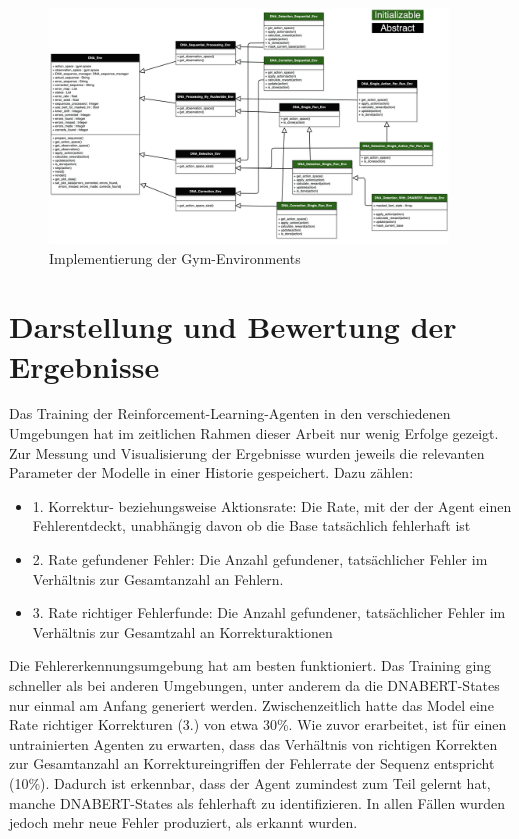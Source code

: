 \documentclass[oneside,bibliography=totocnumbered,BCOR=5mm]{scrbook}%
\theoremstyle{definition}
\theoremstyle{definition}
\theoremstyle{definition}
\theoremstyle{definition}
\theoremstyle{definition}
\theoremstyle{definition}
\begin{document}
\begin{figure}[t!]
  \centering
  \includegraphics[width=400px,keepaspectratio]{images/classes.png}
  \caption{Implementierung der Gym-Environments}
  \label{gymClasses}
\end{figure}

\chapter{Darstellung und Bewertung der Ergebnisse}
Das Training der Reinforcement-Learning-Agenten in den verschiedenen Umgebungen hat im 
zeitlichen Rahmen dieser Arbeit nur wenig Erfolge gezeigt.
Zur Messung und Visualisierung der Ergebnisse wurden jeweils die relevanten Parameter der Modelle 
in einer Historie gespeichert. Dazu zählen:  \\

\begin{itemize}
  \item 1. Korrektur- beziehungsweise Aktionsrate: Die Rate, mit der der Agent einen Fehlerentdeckt, 
  unabhängig davon ob die Base tatsächlich fehlerhaft ist
  \item 2. Rate gefundener Fehler: Die Anzahl gefundener, tatsächlicher Fehler im Verhältnis 
  zur Gesamtanzahl an Fehlern.
  \item 3. Rate richtiger Fehlerfunde: Die Anzahl gefundener, tatsächlicher Fehler im Verhältnis zur
  Gesamtzahl an Korrekturaktionen
\end{itemize}

Die Fehlererkennungsumgebung hat am besten funktioniert. Das Training ging schneller als bei
anderen Umgebungen, unter anderem da die DNABERT-States nur einmal am Anfang generiert werden.
Zwischenzeitlich hatte das Model eine Rate richtiger Korrekturen (3.) von etwa 30\%. 
Wie zuvor erarbeitet, ist für einen untrainierten Agenten zu erwarten, dass das Verhältnis von 
richtigen Korrekten zur Gesamtanzahl an Korrektureingriffen der Fehlerrate der Sequenz entspricht (10\%).
Dadurch ist erkennbar, dass der Agent zumindest zum Teil gelernt hat, manche DNABERT-States 
als fehlerhaft zu identifizieren. In allen Fällen wurden jedoch mehr neue Fehler produziert,
als erkannt wurden. \\
\end{document}
